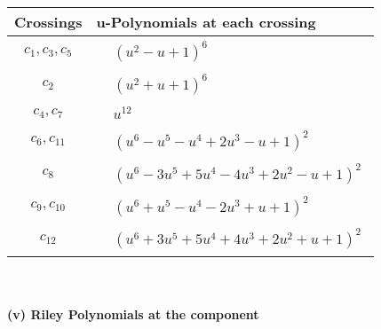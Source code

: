 \documentclass[1p]{elsarticle_modified}
\theoremstyle{definition}
\begin{document}
\begin{tabular}{m{50pt}|m{274pt}}
Crossings & \hspace{64pt}u-Polynomials at each crossing \\
\hline $$\begin{aligned}c_{1},c_{3},c_{5}\end{aligned}$$&$\begin{aligned}
&(u^2- u+1)^6
\end{aligned}$\\
\hline $$\begin{aligned}c_{2}\end{aligned}$$&$\begin{aligned}
&(u^2+u+1)^6
\end{aligned}$\\
\hline $$\begin{aligned}c_{4},c_{7}\end{aligned}$$&$\begin{aligned}
&u^{12}
\end{aligned}$\\
\hline $$\begin{aligned}c_{6},c_{11}\end{aligned}$$&$\begin{aligned}
&(u^6- u^5- u^4+2 u^3- u+1)^2
\end{aligned}$\\
\hline $$\begin{aligned}c_{8}\end{aligned}$$&$\begin{aligned}
&(u^6-3 u^5+5 u^4-4 u^3+2 u^2- u+1)^2
\end{aligned}$\\
\hline $$\begin{aligned}c_{9},c_{10}\end{aligned}$$&$\begin{aligned}
&(u^6+u^5- u^4-2 u^3+u+1)^2
\end{aligned}$\\
\hline $$\begin{aligned}c_{12}\end{aligned}$$&$\begin{aligned}
&(u^6+3 u^5+5 u^4+4 u^3+2 u^2+u+1)^2
\end{aligned}$\\
\hline
\end{tabular}\\~\\
\newpage\renewcommand{\arraystretch}{1}
\flushleft \textbf{(v) Riley Polynomials at the component}\newline \\
\end{document}
